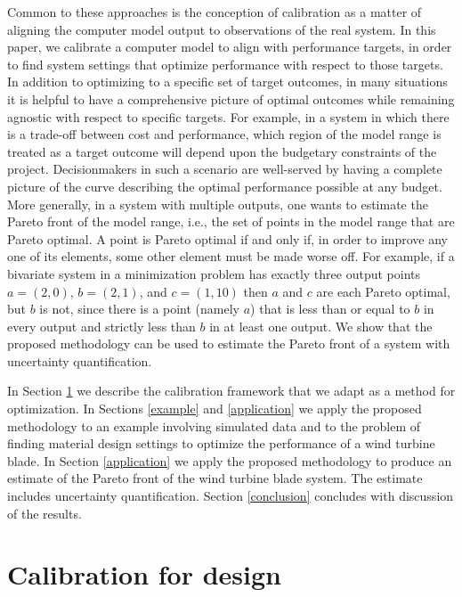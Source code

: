 \documentclass[12pt]{article}
\begin{document}
Common to these approaches is the conception of calibration as a matter of aligning the computer model output to observations of the real system. 
%
In this paper, we calibrate a computer model to align with performance targets, in order to find system settings that optimize performance with respect to those targets.
%
In addition to optimizing to a specific set of target outcomes, in many situations it is helpful to have a comprehensive picture of optimal outcomes while remaining agnostic with respect to specific targets.
%
For example, in a system in which there is a trade-off between cost and performance, which region of the model range is treated as a target outcome will depend upon the budgetary constraints of the project.
%
Decisionmakers in such a scenario are well-served by having a complete picture of the curve describing the optimal performance possible at any budget.
%
More generally, in a system with multiple outputs, one wants to estimate the Pareto front of the model range, i.e., the set of points in the model range that are Pareto optimal.
%
A point is Pareto optimal if and only if, in order to improve any one of its elements, some other element must be made worse off.
%
For example, if a bivariate system in a minimization problem has exactly three output points $a=(2,0)$, $b=(2,1)$, and $c=(1,10)$ then $a$ and $c$ are each Pareto optimal, but $b$ is not, since there is a point (namely $a$) that is less than or equal to $b$ in every output and strictly less than $b$ in at least one output.
%
We show that the proposed methodology can be used to estimate the Pareto front of a system with uncertainty quantification. 
%

In Section \ref{calib_for_design} we describe the calibration framework that we adapt as a method for optimization. 
%
In Sections \ref{example} and \ref{application} we apply the proposed methodology to an example involving simulated data and to the problem of finding material design settings to optimize the performance of a wind turbine blade.
%
In Section \ref{application} we apply the proposed methodology to produce an estimate of the Pareto front of the wind turbine blade system.
%
The estimate includes uncertainty quantification.
%
Section \ref{conclusion} concludes with discussion of the results.

\section{Calibration for design}\label{calib_for_design}
\end{document}
